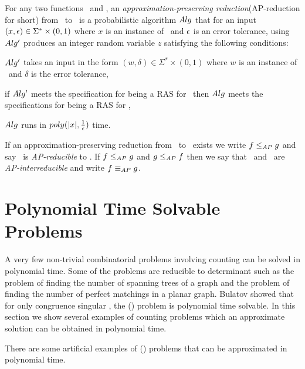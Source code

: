 \begin{defi}[AP-reduction]
For any two functions \mf\ and \mg, 
an \emph{approximation-preserving reduction}(AP-reduction for short)
from \mf\ to \mg\ is a probabilistic algorithm \(Alg\) that for an input 
\((x,\epsilon) \in \Sigma^*\times(0,1)\) where \(x\) is an instance of \mf\ and \(\epsilon\) 
is an error tolerance, using \(Alg'\) produces an integer random variable \(z\)
satisfying the following  conditions: \begin{inparaenum}[(i)] \item \(Alg'\) takes 
an input in the form \((w,\delta) \in \Sigma^*\times(0,1)\) where \(w\) is an instance of \mg\
and \(\delta\) is the error tolerance, \item if \(Alg'\) meets the specification for
being a RAS for \mg\ then \(Alg\) meets the specifications for being a RAS for \mf, \item
\(Alg\) runs in \(poly(|x|,\frac{1}{\epsilon})\) time.
\end{inparaenum}
\end{defi}

If an approximation-preserving reduction from \mf\ to \mg\ exists we write \(f \le_{AP} g\)
and say \mf\ is \emph{AP-reducible} to \mg. If \(f \le_{AP} g\) and \(g \le_{AP} f\)
then we say that  \mf\ and \mg\ are \emph{AP-interreducible} and write \(f \equiv_{AP} g\)\@. 


\section{Polynomial Time Solvable Problems}
A very few non-trivial combinatorial problems involving counting 
can be solved in polynomial time.
Some of the problems are reducible to determinant such as
the problem of finding the number of spanning trees of a graph and 
the problem of finding the number of perfect matchings in a planar graph.
Bulatov \cite{Bulatov} showed that for only congruence singular \mrelset, the \ccsp(\mrelset)
problem  is polynomial time solvable. In this section we show several
examples of counting problems which an approximate solution can be obtained in polynomial time.

There are some artificial examples of \ccsp(\mrelset) problems that can be approximated 
in polynomial time. 

